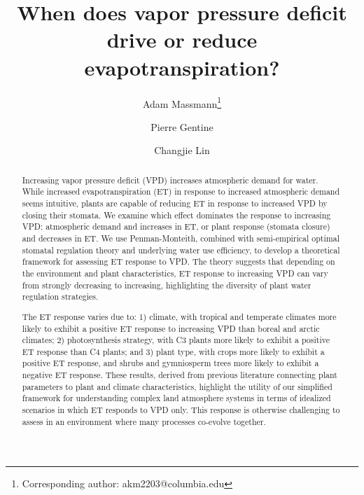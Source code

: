 \documentclass[12pt]{article}
\begin{document}
\title{When does vapor pressure deficit drive or reduce
  evapotranspiration?}

\author[1]{Adam Massmann\thanks{Corresponding author: akm2203@columbia.edu}}
\author[1]{Pierre Gentine}
\author[1,2]{Changjie Lin}


\maketitle

\begin{abstract}
Increasing vapor pressure deficit (VPD) increases atmospheric demand
for water. While increased evapotranspiration (ET) in response to
increased atmospheric demand seems intuitive, plants are capable of
reducing ET in response to increased VPD by closing their stomata. We
examine which effect dominates the response to increasing VPD:
atmospheric demand and increases in ET, or plant response (stomata
closure) and decreases in ET. We use Penman-Monteith, combined with
semi-empirical optimal stomatal regulation theory and underlying water
use efficiency, to develop a theoretical framework for assessing ET
response to VPD. The theory suggests that depending on the environment
and plant characteristics, ET response to increasing VPD can vary from
strongly decreasing to increasing, highlighting the diversity of plant
water regulation strategies.

The ET response varies due to: 1) climate, with tropical and temperate
climates more likely to exhibit a positive ET response to increasing
VPD than boreal and arctic climates; 2) photosynthesis strategy, with
C3 plants more likely to exhibit a positive ET response than C4
plants; and 3) plant type, with crops more likely to exhibit a
positive ET response, and shrubs and gymniosperm trees more likely to
exhibit a negative ET response. These results, derived from previous
literature connecting plant parameters to plant and climate
characteristics, highlight the utility of our simplified framework for
understanding complex land atmosphere systems in terms of idealized
scenarios in which ET responds to VPD only. This response is otherwise
challenging to assess in an environment where many processes co-evolve
together.
\end{abstract}
\end{document}
